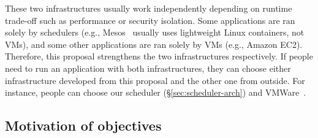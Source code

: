 These two infrastructures usually work independently depending on 
runtime trade-off such as performance or security isolation. Some applications 
are ran solely by schedulers (e.g., Mesos~\cite{mesos:nsdi11} usually uses 
lightweight Linux containers, not VMs), and some other applications are ran 
solely by VMs (e.g., Amazon EC2). Therefore, this proposal strengthens the 
two infrastructures respectively. If people need to run an application with 
both infrastructures, they can choose either infrastructure developed from 
this proposal and the other one from outside. For instance, people can choose 
our \tripod scheduler (\S\ref{sec:scheduler-arch}) and VMWare~\cite{esx:osdi02}.





% 




\vspace{-.15in}\subsection{Motivation of objectives} 
\label{sec:motivation}\vspace{-.075in}

